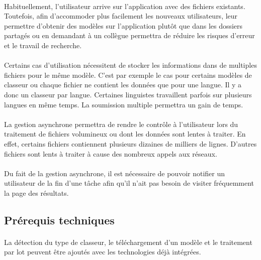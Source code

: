 \paragraph{}
Habituellement, l'utilisateur arrive sur l'application avec des fichiers existants. Toutefois, afin d'accommoder plus facilement les nouveaux utilisateurs, leur permettre d'obtenir des modèles sur l'application plutôt que dans les dossiers partagés ou en demandant à un collègue permettra de réduire les risques d'erreur et le travail de recherche.

\paragraph{}
Certains cas d'utilisation nécessitent de stocker les informations dans de multiples fichiers pour le même modèle.
C'est par exemple le cas pour certains modèles de classeur ou chaque fichier ne contient les données que pour une langue.
Il y a donc un classeur par langue.
Certaines linguistes travaillent parfois sur plusieurs langues en même temps.
La soumission multiple permettra un gain de temps.

\paragraph{}
La gestion asynchrone permettra de rendre le contrôle à l'utilisateur lors du traitement de fichiers volumineux ou dont les données sont lentes à traiter.
En effet, certains fichiers contiennent plusieurs dizaines de milliers de lignes.
D'autres fichiers sont lents à traiter à cause des nombreux appels aux réseaux.

\paragraph{}
Du fait de la gestion asynchrone, il est nécessaire de pouvoir notifier un utilisateur de la fin d'une tâche afin qu'il n'ait pas besoin de visiter fréquemment la page des résultats.

\subsection{Prérequis techniques}
\label{subsec:nex-version-technical-requirements}

\paragraph{}
La détection du type de classeur, le téléchargement d'un modèle et le traitement par lot peuvent être ajoutés avec les technologies déjà intégrées.

